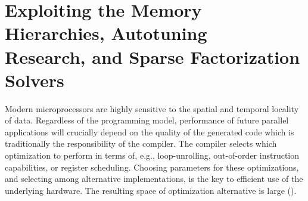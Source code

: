 %
%
%

\section[Memory Hierarchies, Autotuning, and Solvers]{Exploiting the Memory Hierarchies, Autotuning\\ Research, and Sparse Factorization Solvers}
\label{sec:modeling-intro}

Modern microprocessors are highly sensitive to the spatial and temporal locality of data. Regardless of the programming model, performance of future parallel applications will crucially depend on the quality of the generated code which is traditionally the responsibility of the compiler. The compiler selects which optimization to perform in terms of, e.g., loop-unrolling, out-of-order instruction capabilities, or register scheduling. Choosing parameters for these optimizations, and selecting among alternative implementations, is the key to efficient use of the underlying hardware. The resulting space of optimization alternative is large (\cite{8423171}).

